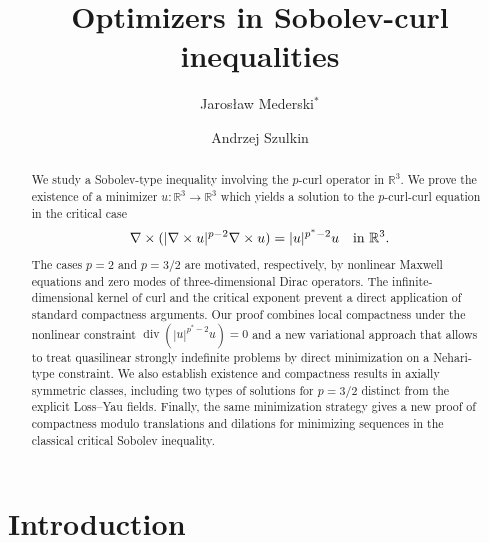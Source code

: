 \documentclass[12pt,leqno,twoside]{amsart}
\title{Optimizers in Sobolev-curl inequalities}
\author[J. Mederski]{Jaros\l aw Mederski$^{*}$}
\author[A. Szulkin]{Andrzej Szulkin}
\def\curlop{\nabla\times}
\numberwithin{equation}{section}
\begin{document}
\begin{abstract} 
We study a Sobolev-type inequality involving the $p$-curl operator in $\mathbb{R}^3$. We prove the existence of a minimizer $u:\mathbb{R}^3\to \mathbb{R}^3$ which yields a solution to the $p$-curl-curl equation in the critical case
$$
\curlop (|\curlop u|^{p-2}\curlop u)= |u|^{p^*-2}u\quad \hbox{in }\mathbb{R}^3.$$	
The cases $p=2$ and $p=3/2$ are motivated, respectively, by nonlinear
Maxwell equations and zero modes of three-dimensional Dirac operators. The infinite-dimensional kernel of curl and the critical exponent
prevent a direct application of standard compactness arguments.
Our proof combines local compactness under the nonlinear constraint
$\operatorname{div}(|u|^{p^*-2}u)=0$ and
a new variational approach that allows to treat quasilinear strongly indefinite problems by direct minimization on a Nehari-type constraint. 
We also establish existence and compactness results in axially
symmetric classes, including two types of solutions for $p=3/2$
distinct from the explicit Loss--Yau fields. Finally, the same
minimization strategy gives a new proof of compactness modulo
translations and dilations for minimizing sequences
in the classical critical Sobolev inequality.
\end{abstract}


\maketitle


\section{Introduction} \label{sec:intro}
\end{document}
